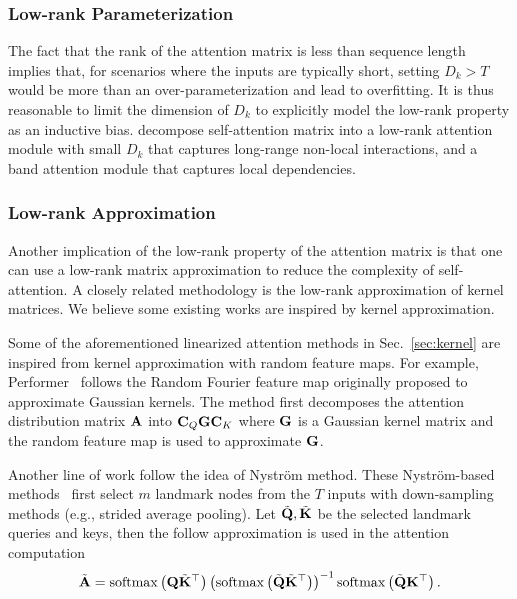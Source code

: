 \documentclass[manuscript,acmsmall,screen,nonacm]{acmart}
\theoremstyle{definition}
\begin{document}
\subsubsection{Low-rank Parameterization}
The fact that the rank of the attention matrix is less than sequence length implies that, for scenarios where the inputs are typically short, setting $D_k>T$ would be more than an over-parameterization and lead to overfitting. It is thus reasonable to limit the dimension of $D_k$ to explicitly model the low-rank property as an inductive bias. \citet{guo19lowrank} decompose self-attention matrix into a low-rank attention module with small $D_k$ that captures long-range non-local interactions, and a band attention module that captures local dependencies.

\subsubsection{Low-rank Approximation}
Another implication of the low-rank property of the attention matrix is that one can use a low-rank matrix approximation to reduce the complexity of self-attention. A closely related methodology is the low-rank approximation of kernel matrices. We believe some existing works are inspired by kernel approximation.

Some of the aforementioned linearized attention methods in Sec.~\ref{sec:kernel} are inspired from kernel approximation with random feature maps. For example, Performer~\cite{choromanski2020masked} follows the Random Fourier feature map originally proposed to approximate Gaussian kernels. The method first decomposes the attention distribution matrix $\mathbf{A}$ into $\mathbf{C}_Q\mathbf{G}\mathbf{C}_K$ where $\mathbf{G}$ is a Gaussian kernel matrix and the random feature map is used to approximate $\mathbf{G}$.

Another line of work follow the idea of Nystr\"om method. These Nystr\"om-based methods~\cite{chen20compressedlowrank,xiong21nystromformer} first select $m$ landmark nodes from the $T$ inputs with down-sampling methods (e.g., strided average pooling). Let $\tilde{\mathbf{Q}},\tilde{\mathbf{K}}$ be the selected landmark queries and keys, then the follow approximation is used in the attention computation
\begin{equation}\label{eq:nystrom}
    \tilde{\mathbf{A}}=\mathrm{softmax}\left(\mathbf{Q}\tilde{\mathbf{K}}^\top\right)\left(\mathrm{softmax}\left(\tilde{\mathbf{Q}}\tilde{\mathbf{K}}^\top\right)\right)^{-1}\mathrm{softmax}\left(\tilde{\mathbf{Q}}\mathbf{K}^\top\right).
\end{equation}
\end{document}
